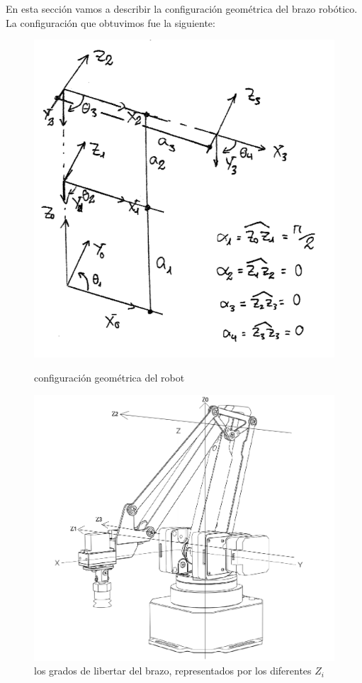 \documentclass[a4paper,12pt]{article}
\begin{document}
En esta sección vamos a describir la configuración geométrica del brazo robótico. La
configuración que obtuvimos fue la siguiente:
\begin{figure}[H]
    \begin{minipage}{.48\linewidth}
        \centering
        \includegraphics[width=\linewidth]{images/geometric_configuration.png}
        \caption{configuración geométrica del robot}
        \label{fig:robot_config}
    \end{minipage}\hfill
    \begin{minipage}{.48\linewidth}
        \centering
        \includegraphics[width=\linewidth]{images/axis.png}
        \caption{los grados de libertar del brazo, representados por los diferentes $Z_i$}
        \label{fig:axis}
    \end{minipage}
\end{figure}
\end{document}
